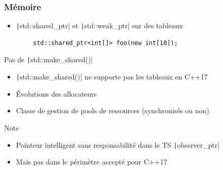 \documentclass[C++.tex]{subfiles}
\begin{document}
\begin{frame}[fragile]
	\frametitle{Mémoire}
	\begin{itemize}
		\item \texttt|std::shared_ptr| et \texttt|std::weak_ptr| sur des tableaux
	\end{itemize}

	\begin{verbatim}
		std::shared_ptr<int[]> foo(new int[10]);
	\end{verbatim}

	\begin{alertblock}{Pas de \texttt|std::make_shared()|}
		\begin{itemize}
			\item \texttt|std::make_shared()| ne supporte pas les tableaux en C++17
		\end{itemize}
	\end{alertblock}

	\begin{itemize}
		\item Évolutions des allocateurs


		\item Classe de gestion de pools de ressources (synchronisés ou non)
	\end{itemize}

	\begin{block}{Note}
		\begin{itemize}
			\item Pointeur intelligent sans responsabilité dans le TS \texttt|observer_ptr|
			\item Mais pas dans le périmètre accepté pour C++17
		\end{itemize}
	\end{block}
\end{frame}
\end{document}
